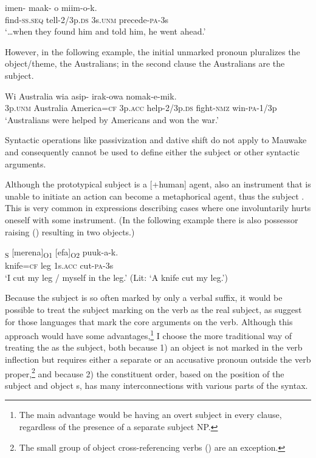 \ea%
\label{ex:x921}
\gll {\dots}imen-  maak-  o  miim-o-k. \\
     find-\textsc{ss}.\textsc{seq}  tell-2/3p.\textsc{ds}  3s.\textsc{unm}  precede-\textsc{pa}-3s \\
\glt `{\dots}when they found him and told him, he went ahead.'
\z

However, in the following example, the initial unmarked pronoun   pluralizes the object/theme, the Australians; in the second clause the Australians are the subject.

\ea%
\label{ex:x922}
\gll Wi  Australia    wia  asip- irak-owa  nomak-e-mik. \\
     3p.\textsc{unm}  Australia  America=\textsc{cf}  3p.\textsc{acc}  help-2/3p.\textsc{ds} fight-\textsc{nmz}  win-\textsc{pa}-1/3p \\
\glt `Australians were helped by Americans and won the war.'
\z

Syntactic operations like passivization and dative shift do not apply to Mauwake and consequently cannot be used to define either the subject or other syntactic arguments. 

Although the prototypical subject is a [+human] agent, also an instrument that is unable to initiate an action can become a metaphorical agent, thus the subject \citep[106]{Givon1984}. This is very common in expressions describing cases where one involuntarily hurts oneself with some instrument. (In the following example there is also possessor raising () resulting in two objects.)

\ea%
\label{ex:x958}
\gll [\textstyleEmphasizedVernacularWords{Fura=ke}]\textsubscript{S}  [merena]\textsubscript{O1}  [efa]\textsubscript{O2}  puuk-a-k. \\
     knife=\textsc{cf}  leg  1s.\textsc{acc}  cut-\textsc{pa}-3s \\
\glt `I cut my leg / myself in the leg.' (Lit: `A knife cut my leg.')
\z

Because the subject is so often marked by only a verbal suffix, it would be possible to treat the subject marking on the verb as the real subject, as \citet[33--34]{VanValinEtAl1997} suggest for those languages that mark the core arguments on the verb. Although this approach would have some advantages,\footnote{The main advantage would be having an overt subject in every clause, regardless of the presence of a separate subject NP.} I choose the more traditional way of treating the  as the subject, both because 1) an object is not marked in the verb inflection but requires either a separate  or an accusative pronoun outside the verb proper,\footnote{The small group of object cross-referencing verbs () are an exception.} and because 2) the constituent order, based on the position of the subject and object s, has many interconnections with various parts of the syntax. 

